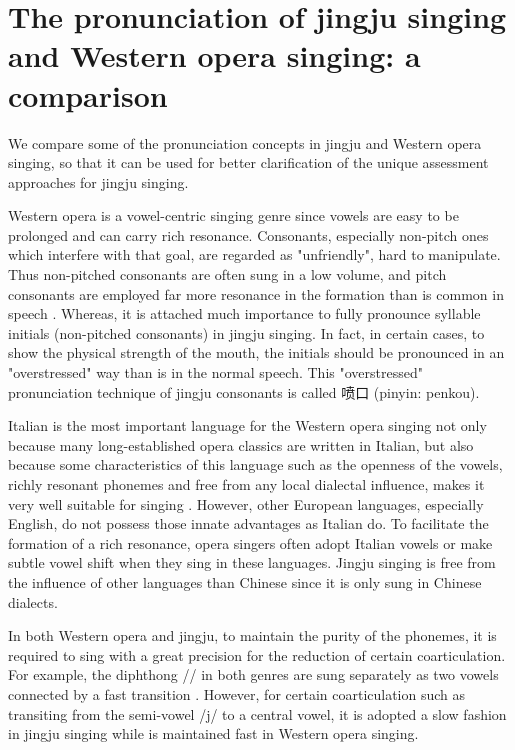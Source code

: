 \section{The pronunciation of jingju singing and Western opera singing: a comparison}

We compare some of the pronunciation concepts in jingju and Western opera singing, so that it can be used for better clarification of the unique assessment approaches for jingju singing.

Western opera is a vowel-centric singing genre since vowels are easy to be prolonged and can carry rich resonance. Consonants, especially non-pitch ones which interfere with that goal, are regarded as "unfriendly", hard to manipulate. Thus non-pitched consonants are often sung in a low volume, and pitch consonants are employed far more resonance in the formation than is common in speech \cite{Nair1999}. Whereas, it is attached much importance to fully pronounce syllable initials (non-pitched consonants) in jingju singing. In fact, in certain cases, to show the physical strength of the mouth, the initials should be pronounced in an "overstressed" way than is in the normal speech. This "overstressed" pronunciation technique of jingju consonants is called 喷口 (pinyin: penkou).

Italian is the most important language for the Western opera singing not only because many long-established opera classics are written in Italian, but also because some characteristics of this language such as the openness of the vowels, richly resonant phonemes and free from any local dialectal influence, makes it very well suitable for singing \cite{Nair1999}. However, other European languages, especially English, do not possess those innate advantages as Italian do. To facilitate the formation of a rich resonance, opera singers often adopt Italian vowels or make subtle vowel shift \cite{Nair1999} when they sing in these languages. Jingju singing is free from the influence of other languages than Chinese since it is only sung in Chinese dialects.

In both Western opera and jingju, to maintain the purity of the phonemes, it is required to sing with a great precision for the reduction of certain coarticulation. For example, the diphthong // in both genres are sung separately as two vowels connected by a fast transition \cite{Nair1999}. However, for certain coarticulation such as transiting from the semi-vowel /j/ to a central vowel, it is adopted a slow fashion in jingju singing while is maintained fast in Western opera singing.

